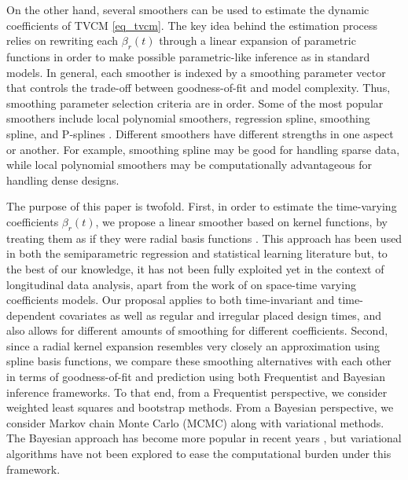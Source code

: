 \documentclass[letterpaper,10pt,openany]{article}
\def\be{\beta}\def\bev{\boldsymbol{\beta}}
\begin{document}
On the other hand, several smoothers can be used to estimate the dynamic coefficients of \textsf{TVCM} \eqref{eq_tvcm}. The key idea behind the estimation process relies on rewriting each $\be_r(t)$ through a linear expansion of parametric functions in order to make possible parametric-like inference as in standard models. In general, each smoother is indexed by a smoothing parameter vector that controls the trade-off between goodness-of-fit and model complexity. Thus, smoothing parameter selection criteria are in order. Some of the most popular smoothers include local polynomial smoothers, regression spline, smoothing spline, and P-splines \citep{wu-zhang-06,wu-tian-2018}. Different smoothers have different strengths in one aspect or another. For example, smoothing spline may be good for handling sparse data, while local polynomial smoothers may be computationally advantageous for handling dense designs.


The purpose of this paper is twofold. First, in order to estimate the time-varying coefficients $\beta_r(t)$, we propose a linear smoother based on kernel functions, by treating them as if they were radial basis functions \citep[see][for a complete catacterization of radial basis funcions]{buhmann-04}. This approach has been used in both the semiparametric regression \citep{ruppert-2003-semiparametric} and statistical learning literature \citep{hastie-2009-elements,harezlak-2018-semiparametric} but, to the best of our knowledge, it has not been fully exploited yet in the context of longitudinal data analysis, apart from the work of \cite{serban-2011-space} on space-time varying coefficients models. Our proposal applies to both time-invariant and time-dependent covariates as well as regular and irregular placed design times, and also allows for different amounts of smoothing for different coefficients. Second, since a radial kernel expansion resembles very closely an approximation using spline basis functions, we compare these smoothing alternatives with each other in terms of goodness-of-fit and prediction using both Frequentist and Bayesian inference frameworks. To that end, from a Frequentist perspective, we consider weighted least squares and bootstrap methods. From a Bayesian perspective, we consider Markov chain Monte Carlo (MCMC) along with variational methods. The Bayesian approach has become more popular in recent years  \citep{biller-2001-bayesian, waller-2007-quantifying, hua-2011-bayesian, memmedli-2012-application, jeong-2016-bayesian, lu-2017-bayesian, franco-2019-unified}, but variational algorithms have not been explored to ease the computational burden under this framework.
\end{document}
